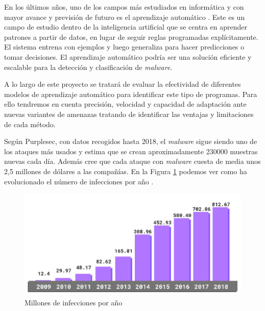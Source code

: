 \vspace{1em}

En los últimos años, uno de los campos más estudiados en  informática y con mayor avance y previsión de futuro es el aprendizaje automático \cite{ml}. Este es un campo de estudio dentro de la inteligencia artificial que se centra en aprender patrones a partir de datos, en lugar de seguir reglas programadas explícitamente. El sistema entrena con ejemplos y luego generaliza para hacer predicciones o tomar decisiones. El aprendizaje automático podría ser una solución eficiente y escalable para la detección y clasificación de \textit{malware}.

\vspace{1em}

A lo largo de este proyecto se tratará de evaluar la efectividad de diferentes modelos de aprendizaje automático para identificar este tipo de programas. Para ello tendremos en cuenta precisión, velocidad y capacidad de adaptación ante nuevas variantes de amenazas tratando de identificar las ventajas y limitaciones de cada método.

\vspace{1em}

Según Purplesec, con datos recogidos hasta 2018, el \textit{malware} sigue siendo uno de los ataques más usados y estima que se crean aproximadamente 230000 muestras nuevas cada día. Además cree que cada ataque con \textit{malware} cuesta de media unos 2,5 millones de dólares a las compañías. En la Figura \ref{fig:infeccxyear} podemos ver como ha evolucionado el número de infecciones por año \cite{purplesec}.

\begin{figure}[H]
	\centering
	\includegraphics[width=1\textwidth]{Imagenes/incremento_malware}
	\caption{Millones de infecciones por año}
	\label{fig:infeccxyear}
\end{figure}
